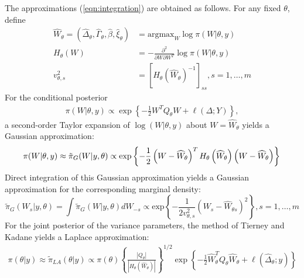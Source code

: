 \documentclass[num-refs,serif,10pt]{wiley-article}
\begin{document}
The approximations (\ref{eqn:integration}) are obtained as follows. For any fixed $\theta$, define
\begin{equation}\begin{aligned}\label{eqn:modeandhessian}
\widehat{W}_{\theta} = \left( \widehat{\Delta}_{\theta},\widehat{\Gamma}_{\theta},\widehat{\beta},\widehat{\xi}_{\theta}\right) &= \text{argmax}_{W}\log\pi(W|\theta,y) \\ 
H_{\theta}(W) &= -\frac{\partial^{2}}{\partial W \partial W^{T}}\log\pi(W|\theta,y) \\
v_{\theta,s}^{2} &= \left[H_\theta \left(\widehat{W}_{\theta}\right) ^ {-1} \right]_{ss}, s = 1,\ldots,m
\end{aligned}\end{equation}
For the conditional posterior
\begin{equation}\begin{aligned}\label{eqn:condpost}
\pi(W|\theta,y) \propto \exp\left\lbrace -\frac{1}{2}W^{T}Q_{\theta}W + \ell\left(\Delta;Y\right)\right\rbrace,
\end{aligned}\end{equation}
a second-order Taylor expansion of $\log(W|\theta,y)$ about $W = \widehat{W}_{\theta}$ yields a Gaussian approximation:
\begin{equation}\label{eqn:gaussianapprox}
\pi(W|\theta,y) \approx \tilde{\pi}_{G}(W|y,\theta) \propto \text{exp}\left\{-\frac{1}{2} \left(W-\widehat{W}_{\theta} \right)^T H_\theta\left(\widehat{W}_{\theta}\right) \left(W-\widehat{W}_{\theta} \right) \right\} \\
\end{equation}
Direct integration of this Gaussian approximation yields a Gaussian approximation for the corresponding marginal density:
\begin{equation}\label{eqb:marginalgaussianapprox}
\tilde{\pi}_{G}(W_{s}|y,\theta) = \int\tilde{\pi}_{G}(W|y,\theta)dW_{-s} \propto\text{exp}\left\{-\frac{1}{2v_{\theta,s}^{2}} \left(W_s-\widehat{W}_{\theta s} \right)^2 \right\}, s = 1,\ldots,m
\end{equation}
For the joint posterior of the variance parameters, the method of Tierney and Kadane \cite{tierney} yields a Laplace approximation:
\begin{equation}\begin{aligned}\label{eqn:laplace}
\pi(\theta|y) \approx \tilde{\pi}_{LA}(\theta|y) \propto \pi(\theta)\left\{\frac{\left|Q_{\theta}\right|}{\left|H_{\theta}\left(\widehat{W}_{\theta}\right)\right|}\right\}^{1/2}\exp\left\{ -\frac{1}{2}\widehat{W}_{\theta}^{T}Q_{\theta}\widehat{W}_{\theta} + \ell\left(\widehat{\Delta}_{\theta};y \right)\right\}
\end{aligned}\end{equation}
\end{document}
